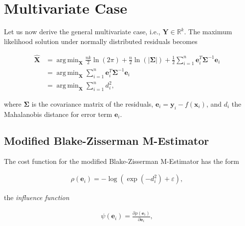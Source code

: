 \documentclass[12pt]{article}
\DeclareMathOperator*{\argmin}{arg\,min}
\begin{document}
  \section{Multivariate Case}

    Let us now derive the general multivariate case, i.e.,
    $\mathbf{Y}\in\mathbb{R}^k$. The maximum likelihood solution under normally
    distributed residuals becomes

    \begin{equation}\label{eqn:modelmdminllnorm}
      \begin{aligned}
        \mathbf{\hat{X}} &=
          \argmin_{\mathbf{X}}\frac{n k}{2}\ln(2\pi)+
            \frac{n}{2}\ln(|\boldsymbol{\Sigma}|)+\frac{1}{2}
            \sum_{i=1}^n\mathbf{e}_i^T\boldsymbol{\Sigma}^{-1}\mathbf{e}_i
            \\&=\argmin_{\mathbf{X}}
            \sum_{i=1}^n\mathbf{e}_i^T\boldsymbol{\Sigma}^{-1}\mathbf{e}_i
            \\&=\argmin_{\mathbf{X}}
            \sum_{i=1}^n d_i^2,
      \end{aligned}
    \end{equation}

    \noindent where $\boldsymbol{\Sigma}$ is the covariance matrix of the
    residuals, $\mathbf{e}_i=\mathbf{y}_i-f(\mathbf{x}_i)$, and $d_i$ the
    Mahalanobis distance for error term $\mathbf{e}_i$.

    \subsection{Modified Blake-Zisserman M-Estimator}
    The cost function for the modified Blake-Zisserman M-Estimator has the form

    \begin{equation}\label{eqn:bzcmv}
      \begin{aligned}
        \rho(\mathbf{e}_i) = -\log(\exp(-d_i^2) + \varepsilon),
      \end{aligned}
    \end{equation}

    \noindent the \emph{influence function}

    \begin{equation}\label{eqn:bzimv}
      \begin{aligned}
        \psi(\mathbf{e}_i) = \frac{\partial \rho(\mathbf{e}_i)}
        {\partial \mathbf{e}_i},
      \end{aligned}
    \end{equation}
\end{document}
